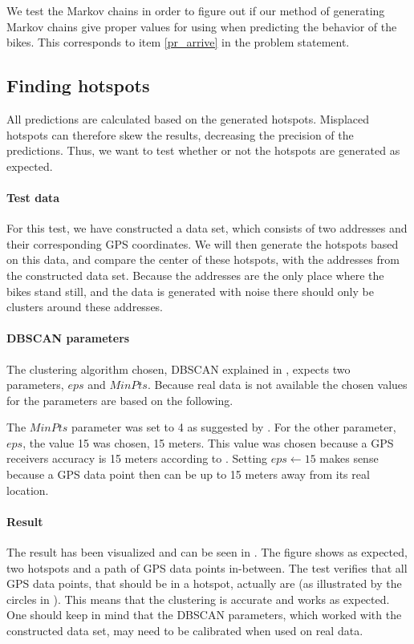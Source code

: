 We test the Markov chains in order to figure out if our method of generating Markov chains give proper values for using when predicting the behavior of the bikes.
This corresponds to item \ref{pr_arrive} in the problem statement.

\subsection{Finding hotspots}
All predictions are calculated based on the generated hotspots.
Misplaced hotspots can therefore skew the results, decreasing the precision of the predictions.
Thus, we want to test whether or not the hotspots are generated as expected.

\paragraph{Test data}
For this test, we have constructed a data set, which consists of two addresses and their corresponding GPS coordinates.
We will then generate the hotspots based on this data, and compare the center of these hotspots, with the addresses from the constructed data set.
Because the addresses are the only place where the bikes stand still, and the data is generated with noise there should only be clusters around these addresses.

\paragraph{DBSCAN parameters}
The clustering algorithm chosen, DBSCAN explained in , expects two parameters, $eps$ and $MinPts$.
Because real data is not available the chosen values for the parameters are based on the following.

The $MinPts$ parameter was set to 4 as suggested by \citet[Page 529]{pang2006introduction}.
For the other parameter, $eps$, the value 15 was chosen, 15 meters.
This value was chosen because a GPS receivers accuracy is 15 meters according to \citet{garmingps}.
Setting $eps \leftarrow 15$ makes sense because a GPS data point then can be up to 15 meters away from its real location.

\paragraph{Result}
The result has been visualized and can be seen in .
The figure shows as expected, two hotspots and a path of GPS data points in-between.
The test verifies that all GPS data points, that should be in a hotspot, actually are (as illustrated by the circles in ).
This means that the clustering is accurate and works as expected.
One should keep in mind that the DBSCAN parameters, which worked with the constructed data set, may need to be calibrated when used on real data.

